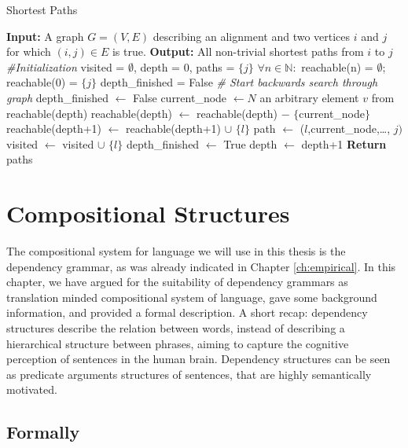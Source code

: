 \documentclass{report}
\theoremstyle{definition}
\theoremstyle{plain}
\begin{document}
\begin{algorithm}[!ht]
\caption{Shortest Paths}\label{alg:shortest paths}
\begin{algorithmic}
\STATE \textbf{Input:} A graph $G = (V,E)$ describing an alignment and two vertices $i$ and $j$ for which $(i,j)\in E$ is true.
\STATE \textbf{Output:} All non-trivial shortest paths from $i$ to $j$
\STATE \textit{\#Initialization}
\STATE visited = $\emptyset$, depth = $0$, paths = $\{j\}$
\STATE $\forall n\in\mathbb{N}:$ reachable(n) = $\emptyset$; reachable($0$) = $\{j\}$
\STATE depth\_finished = False
\STATE \textit{\# Start backwards search through graph}
		\STATE depth\_finished $\leftarrow$ False
		\STATE current\_node $\leftarrow N$ an arbitrary element $v$ from reachable(depth)
		\STATE reachable(depth) $\leftarrow$ reachable(depth) $-$ $\{$current\_node$\}$
				\STATE reachable(depth+1) $\leftarrow$ reachable(depth+1) $\cup$ $\{l\}$
					\STATE path $\leftarrow$ ($l$,current\_node,\ldots, $j)$
				\ENDFOR
			\ENDIF
		\STATE visited $\leftarrow$ visited $\cup$ $\{l\}$
		\ENDFOR
	\STATE depth\_finished $\leftarrow$ True
	\STATE depth $\leftarrow$ depth+1
	\ENDWHILE
\ENDWHILE
\STATE \textbf{Return} paths
\end{algorithmic}
\end{algorithm}


\section{Compositional Structures}

The compositional system for language we will use in this thesis is the dependency grammar, as was already indicated in Chapter \ref{ch:empirical}. In this chapter, we have argued for the suitability of dependency grammars as translation minded compositional system of language, gave some background information, and provided a formal description. A short recap: dependency structures describe the relation between words, instead of describing a hierarchical structure between phrases, aiming to capture the cognitive perception of sentences in the human brain. Dependency structures can be seen as predicate arguments structures of sentences, that are highly semantically motivated.

\subsection{Formally}
\end{document}
